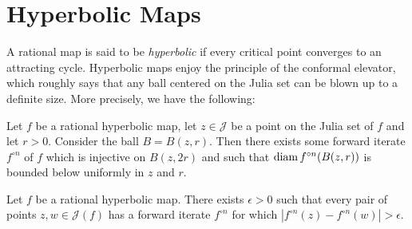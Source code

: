 \section{Hyperbolic Maps}

A rational map is said to be \emph{hyperbolic} if every critical point converges to an attracting cycle.
Hyperbolic maps enjoy the principle of the conformal elevator, which roughly says that any ball centered on the Julia set can be blown up to a definite size. More precisely, we have the following:

\begin{proposition} \label{elevator}
	Let $f$ be a rational hyperbolic map, let $z\in \mathcal J$ be a point on the Julia set of $f$ and let $r>0$. Consider the ball $B=B(z,r)$. Then there exists some forward iterate $f^{\circ n}$ of $f$ which is injective on $B(z,2r)$ and such that
	$\operatorname{diam} {f^{\circ n}(B(z,r))}$ is bounded below uniformly in $z$ and $r$. 
\end{proposition}


\begin{corollary} \label{elevator for points on julia}
	Let $f$ be a rational hyperbolic map. There exists  $\epsilon > 0$ such that every pair of points $z,w\in\mathcal{J}(f)$ has a forward iterate $f^{\circ n}$ for which $\left|f^{\circ n}(z)-f^{\circ n}(w)\right|>\epsilon$.	
\end{corollary}

\begin{comment}
\begin{proof}
	Apply \cref{elevator} to a ball centered on the Julia set which contains $z,w$ on its boundary at roughly antipodal points. After blowing up we get points $f^{\circ n}(z),f^{\circ n}(w)$ which are a definite distance apart by Koebe's distortion theorem. %
\end{proof}
\end{comment}


